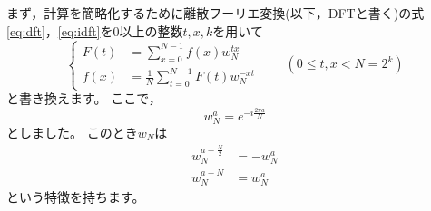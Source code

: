 \documentclass[uplatex, 11pt, a4j, dvipdfmx]{jsarticle}
\begin{document}
    まず，計算を簡略化するために離散フーリエ変換(以下，DFTと書く)の式\eqref{eq:dft}，\eqref{eq:idft}を$0$以上の整数$t, x, k$を用いて
    \begin{equation}
        \left\{ \begin{aligned}
            F(t) &= \sum_{x=0}^{N-1} f(x) w^{tx}_{N} \\
            f(x) &= \frac{1}{N} \sum_{t=0}^{N-1} F(t) w^{-xt}_{N}
        \end{aligned} \right. \qquad (0 \le t, x < N = 2^k) \label{eq:dft-by-w}
    \end{equation}
    と書き換えます。
    ここで，
    \begin{equation}
        w^{a}_{N} = e^{-i \frac{2 \pi a}{N}} \label{eq:e-to-w}
    \end{equation}
    としました。
    このとき$w_{N}$は
    \begin{equation}
        \begin{aligned}
            w^{a + \frac{N}{2}}_{N} &= -w^{a}_{N} \\
            w^{a + N}_{N} &= w^{a}_{N}
        \end{aligned} \label{eq:feature-of-w}
    \end{equation}
    という特徴を持ちます。
\end{document}
